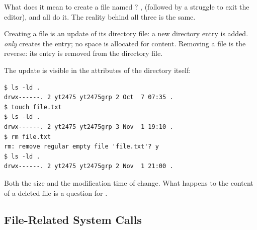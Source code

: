 What does it mean to create a file named ? ,  (followed by a struggle to exit the editor), and  all do it. The reality behind all three is the same.

\begin{keypoint}
  Creating a file is an update of its directory file: a new directory entry is added.  \emph{only} creates the entry; no space is allocated for content. Removing a file is the reverse: its entry is removed from the directory file.
\end{keypoint}

The update is visible in the attributes of the directory itself:
\begin{lstlisting}[style=sh]
$ ls -ld .
drwx------. 2 yt2475 yt2475grp 2 Oct  7 07:35 .
$ touch file.txt
$ ls -ld .
drwx------. 2 yt2475 yt2475grp 3 Nov  1 19:10 .
$ rm file.txt
rm: remove regular empty file 'file.txt'? y
$ ls -ld .
drwx------. 2 yt2475 yt2475grp 2 Nov  1 21:00 .
\end{lstlisting}
Both the size and the modification time of  change. What happens to the content of a deleted file is a question for .

\subsection{File-Related System Calls}

